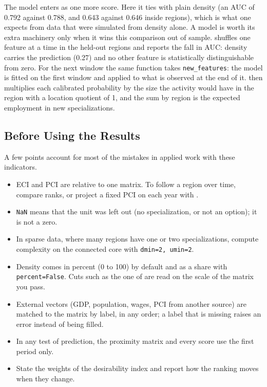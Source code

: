 The model enters  as one more score. Here it
ties with plain density (an AUC of 0.792 against
0.788, and
0.643 against
0.646 inside regions), which is what
one expects from data that were simulated from density alone. A model is worth its extra machinery
only when it wins this comparison out of sample. 
shuffles one feature at a time in the held-out regions and reports the
fall in AUC: density carries the prediction
(0.27) and no other feature is
statistically distinguishable from zero. For the next window the same function takes
\texttt{new\_features}: the model is fitted on the first window and
applied to what is observed at the end of it. 
then multiplies each calibrated probability by the size the activity
would have in the region with a location quotient of 1, and the sum by
region is the expected employment in new specializations.

\subsection{Before Using the Results}

A few points account for most of the mistakes in applied work with these
indicators.

\begin{itemize}[leftmargin=1.5em]
  \item ECI and PCI are relative to one matrix. To follow a region over
    time, compare ranks, or project a fixed PCI on each year with
    .
  \item \texttt{NaN} means that the unit was left out (no
    specialization, or not an option); it is not a zero.
  \item In sparse data, where many regions have one or two
    specializations, compute complexity on the connected core with
    \texttt{dmin=2, umin=2}.
  \item Density comes in percent (0 to 100) by default and as a share
    with \texttt{percent=False}. Cuts such as the one of
     are read on the scale of the matrix you pass.
  \item External vectors (GDP, population, wages, PCI from another
    source) are matched to the matrix by label, in any order; a label
    that is missing raises an error instead of being filled.
  \item In any test of prediction, the proximity matrix and every score
    use the first period only.
  \item State the weights of the desirability index and report how the
    ranking moves when they change.
\end{itemize}
